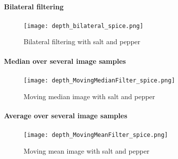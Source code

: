 \documentclass[DIV12,a4paper]{scrartcl}
\begin{document}
\paragraph{Bilateral filtering}
\begin{figure}[!htbp]
  \centering
  \texttt{[image: depth\_bilateral\_spice.png]}
  \caption{Bilateral filtering with salt and pepper}
  \label{fig:bilateral_depth_spice}
\end{figure}
\paragraph{Median over several image samples}
\begin{figure}[!htbp]
  \centering
  \texttt{[image: depth\_MovingMedianFilter\_spice.png]}
  \caption{Moving median image with salt and pepper}
  \label{fig:moving_median_depth_spice}
\end{figure}
\paragraph{Average over several image samples}
\begin{figure}[!htbp]
  \centering
  \texttt{[image: depth\_MovingMeanFilter\_spice.png]}
  \caption{Moving mean image with salt and pepper}
  \label{fig:moving_mean_depth_spice}
\end{figure}
\end{document}
